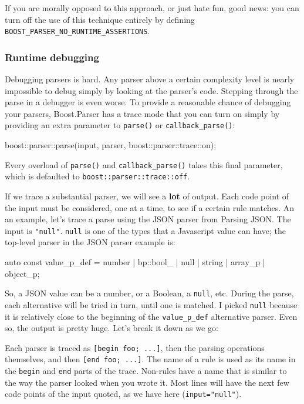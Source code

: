 If you are morally opposed to this approach, or just hate fun, good news: you can turn off the use of this technique entirely by defining \texttt{BOOST\_PARSER\_NO\_RUNTIME\_ASSERTIONS}.

\subsubsection{Runtime debugging}

Debugging parsers is hard. Any parser above a certain complexity level is nearly impossible to debug simply by looking at the parser's code. Stepping through the parse in a debugger is even worse. To provide a reasonable chance of debugging your parsers, Boost.Parser has a trace mode that you can turn on simply by providing an extra parameter to \texttt{parse()} or \texttt{callback\_parse()}:

\begin{code}
boost::parser::parse(input, parser, boost::parser::trace::on);
\end{code}

Every overload of \texttt{parse()} and \texttt{callback\_parse()} takes this final parameter, which is defaulted to \texttt{boost::parser::trace::off}.

If we trace a substantial parser, we will see a \textbf{lot} of output. Each code point of the input must be considered, one at a time, to see if a certain rule matches. An an example, let's trace a parse using the JSON parser from Parsing JSON. The input is \texttt{"null"}. \texttt{null} is one of the types that a Javascript value can have; the top-level parser in the JSON parser example is:

\begin{code}
auto const value_p_def =
    number | bp::bool_ | null | string | array_p | object_p;
\end{code}

So, a JSON value can be a number, or a Boolean, a \texttt{null}, etc. During the parse, each alternative will be tried in turn, until one is matched. I picked \texttt{null} because it is relatively close to the beginning of the \texttt{value\_p\_def} alternative parser. Even so, the output is pretty huge. Let's break it down as we go:

\begin{code}
[begin value; input="null"]
\end{code}

Each parser is traced as \texttt{{[}begin foo; ...{]}}, then the parsing operations themselves, and then \texttt{{[}end foo; ...{]}}. The name of a rule is used as its name in the \texttt{begin} and \texttt{end} parts of the trace. Non-rules have a name that is similar to the way the parser looked when you wrote it. Most lines will have the next few code points of the input quoted, as we have here (\texttt{input="null"}).

